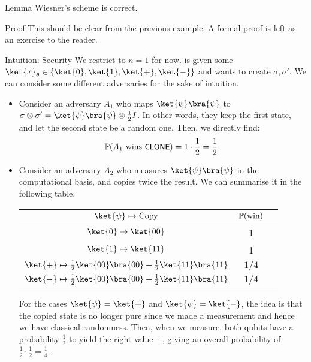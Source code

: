 \documentclass[a4paper]{article}
\begin{document}
\begin{parag}{Lemma}
    Wiesner's scheme is correct.

    \begin{subparag}{Proof}
        This should be clear from the previous example. A formal proof is left as an exercise to the reader.
    \end{subparag}
\end{parag}

\begin{parag}{Intuition: Security}
    We restrict to $n = 1$ for now.  is given some $\ket{x}_{\theta} \in \left\{\ket{0}, \ket{1}, \ket{+}, \ket{-}\right\}$ and wants to create $\sigma, \sigma'$. We can consider some different adversaries for the sake of intuition.
    \begin{itemize}[left=0pt]
        \item Consider an adversary $A_1$ who maps $\ket{\psi}\bra{\psi}$ to $\sigma \otimes \sigma' = \ket{\psi}\bra{\psi} \otimes \frac{1}{2} I$. In other words, they keep the first state, and let the second state be a random one. Then, we directly find: 
        \[\prob\left(\text{$A_1$ wins \lang{CLONE}}\right) = 1 \cdot  \frac{1}{2} = \frac{1}{2}.\]

        \item Consider an adversary $A_2$ who measures $\ket{\psi}\bra{\psi}$ in the computational basis, and copies twice the result. We can summarise it in the following table.
            \begin{center}
            \begin{tabular}{ccc}
                $\ket{\psi} \mapsto \text{Copy}$  & $\prob\left(\text{win}\right)$ \\
                \hline
                $\ket{0} \mapsto \ket{00}$ & 1  \\
                $\ket{1} \mapsto \ket{11}$ & 1  \\
                $\ket{+} \mapsto \frac{1}{2} \ket{00}\bra{00} + \frac{1}{2} \ket{11}\bra{11}$ & $1/4$  \\
                $\ket{-} \mapsto \frac{1}{2} \ket{00}\bra{00} + \frac{1}{2} \ket{11}\bra{11}$ & $1/4$
            \end{tabular}
            \end{center}

            For the cases $\ket{\psi} = \ket{+}$ and $\ket{\psi} = \ket{-}$, the idea is that the copied state is no longer pure since we made a measurement and hence we have classical randomness. Then, when we measure, both qubits have a probability $\frac{1}{2}$ to yield the right value $+$, giving an overall probability of $\frac{1}{2}\cdot \frac{1}{2} = \frac{1}{4}$.


\end{itemize}
\end{parag}
\end{document}
